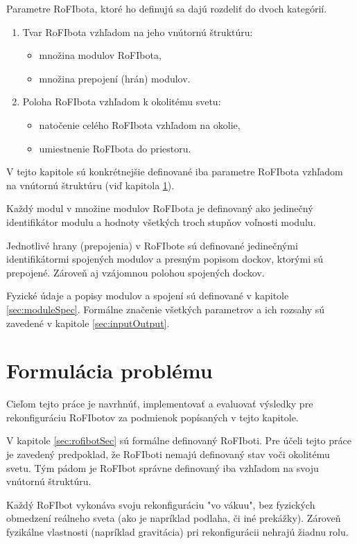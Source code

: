 \documentclass[
  digital, %
  twoside, %
  table,   %
  nolof,     %
  nolot,     %
]{fithesis3}
\begin{document}
Parametre RoFIbota, ktoré ho definujú sa dajú rozdeliť do dvoch kategórií.  
\begin{enumerate}
    \item Tvar RoFIbota vzhľadom na jeho vnútornú štruktúru: 
    \begin{itemize}
        \item množina modulov RoFIbota, 
        \item množina prepojení (hrán) modulov. 
    \end{itemize}
    \item Poloha RoFIbota vzhľadom k okolitému svetu: 
    \begin{itemize}
        \item natočenie celého RoFIbota vzhľadom na okolie, 
        \item umiestnenie RoFIbota do priestoru.  
    \end{itemize}
\end{enumerate}

V tejto kapitole sú konkrétnejšie definované iba parametre RoFIbota vzhľadom na vnútornú štruktúru (viď kapitola \ref{sec:restrictions}). 

Každý modul v množine modulov RoFIbota je definovaný ako jedinečný identifikátor modulu a hodnoty všetkých troch stupňov voľnosti modulu. 

Jednotlivé hrany (prepojenia) v RoFIbote sú definované jedinečnými identifikátormi spojených modulov a presným popisom dockov, ktorými sú prepojené. Zároveň aj vzájomnou polohou spojených dockov. 

Fyzické údaje a popisy modulov a spojení sú definované v kapitole \ref{sec:moduleSpec}. Formálne značenie všetkých parametrov a ich rozsahy sú zavedené v kapitole \ref{sec:inputOutput}. 

\section{Formulácia problému}
\label{sec:restrictions}
Cieľom tejto práce je navrhnúť, implementovať a evaluovať výsledky pre rekonfiguráciu RoFIbotov za podmienok popísaných v tejto kapitole. 

V kapitole \ref{sec:rofibotSec} sú formálne definovaný RoFIboti. Pre účeli tejto práce je zavedený predpoklad, že RoFIboti nemajú definovaný stav voči okolitému svetu. Tým pádom je RoFIbot správne definovaný iba vzhľadom na svoju vnútornú štruktúru. 

Každý RoFIbot vykonáva svoju rekonfiguráciu "vo vákuu", bez fyzických obmedzení reálneho sveta (ako je napríklad podlaha, či iné prekážky). Zároveň fyzikálne vlastnosti (napríklad gravitácia) pri rekonfigurácii nehrajú žiadnu rolu. 
\end{document}
